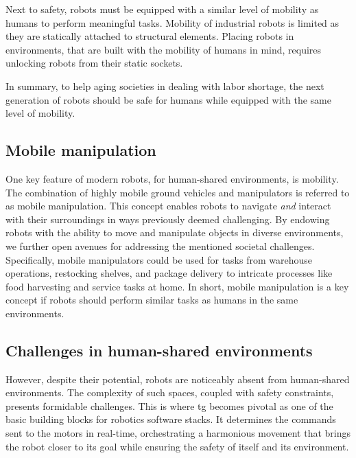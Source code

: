 Next to
safety, robots must be equipped with a similar level of
mobility as humans to perform meaningful tasks. Mobility of
industrial robots is limited as they are statically
attached to structural elements.
Placing
robots in environments, that are built with the mobility of
humans in mind, requires unlocking robots from their static
sockets.

In summary, to help aging societies in dealing with labor
shortage, the next generation of robots should be safe for
humans while equipped with the same level of mobility.

\subsection*{Mobile manipulation}
\label{sub:mobile_manipulation}

One key feature of modern robots, for human-shared
environments, is mobility. The combination of highly mobile
ground vehicles and manipulators is referred to as mobile
manipulation. This concept enables robots to navigate
\textit{and}
interact with their surroundings in ways previously deemed
challenging. By endowing robots with the ability to move and
manipulate objects in diverse environments, we further open
avenues for addressing the mentioned societal challenges.
Specifically, mobile manipulators could be used for tasks
from warehouse operations, restocking shelves, and package
delivery to intricate processes like food harvesting and
service tasks at home.
In short, mobile manipulation is a key concept if robots
should perform similar tasks as humans in the same
environments.


\subsection*{Challenges in human-shared environments}
\label{sub:challenges_in_human_shared_environments}
%
However, despite their potential, robots are noticeably
absent from human-shared environments. The complexity of
such spaces, coupled with safety constraints, presents
formidable challenges. This is where \acf{tg}
becomes pivotal as one of the basic building blocks for
robotics software stacks. It determines the commands sent to
the motors in real-time, orchestrating a harmonious movement
that brings the robot closer to its goal while ensuring the
safety of itself and its environment.

